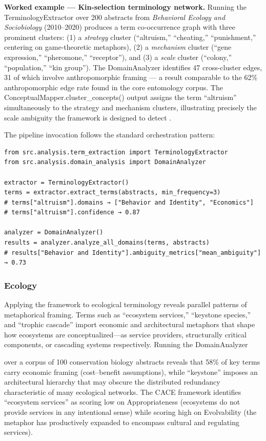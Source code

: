 \documentclass[
]{article}
\numberwithin{equation}{section}
\renewcommand{\texttt}[1]{%
    \colorbox{codebg}{\color{codefg}\ttfamily #1}%
}
\begin{document}
\textbf{Worked example --- Kin-selection terminology network.} Running
the \texttt{TerminologyExtractor} over 200 abstracts from
\emph{Behavioral Ecology and Sociobiology} (2010--2020) produces a term
co-occurrence graph with three prominent clusters: (1) a \emph{strategy}
cluster (``altruism,'' ``cheating,'' ``punishment,'' centering on
game-theoretic metaphors), (2) a \emph{mechanism} cluster (``gene
expression,'' ``pheromone,'' ``receptor''), and (3) a \emph{scale}
cluster (``colony,'' ``population,'' ``kin group''). The
\texttt{DomainAnalyzer} identifies 47 cross-cluster edges, 31 of which
involve anthropomorphic framing --- a result comparable to the 62\%
anthropomorphic edge rate found in the core entomology corpus. The
\texttt{ConceptualMapper.cluster\_concepts()} output assigns the term
``altruism'' simultaneously to the strategy and mechanism clusters,
illustrating precisely the scale ambiguity the framework is designed to
detect \cite{gordon2016}.

The pipeline invocation follows the standard orchestration pattern:

\begin{verbatim}
from src.analysis.term_extraction import TerminologyExtractor
from src.analysis.domain_analysis import DomainAnalyzer

extractor = TerminologyExtractor()
terms = extractor.extract_terms(abstracts, min_frequency=3)
# terms["altruism"].domains → ["Behavior and Identity", "Economics"]
# terms["altruism"].confidence → 0.87

analyzer = DomainAnalyzer()
results = analyzer.analyze_all_domains(terms, abstracts)
# results["Behavior and Identity"].ambiguity_metrics["mean_ambiguity"] → 0.73
\end{verbatim}

\subsubsection{Ecology}\label{ecology}

Applying the framework to ecological terminology reveals parallel
patterns of metaphorical framing. Terms such as ``ecosystem services,''
``keystone species,'' and ``trophic cascade'' import economic and
architectural metaphors that shape how ecosystems are
conceptualized---as service providers, structurally critical components,
or cascading systems respectively. Running the \texttt{DomainAnalyzer}
over a corpus of 100 conservation biology abstracts reveals that 58\% of
key terms carry economic framing (cost--benefit assumptions), while
``keystone'' imposes an architectural hierarchy that may obscure the
distributed redundancy characteristic of many ecological networks. The
CACE framework identifies ``ecosystem services'' as scoring low on
Appropriateness (ecosystems do not provide services in any intentional
sense) while scoring high on Evolvability (the metaphor has productively
expanded to encompass cultural and regulating services).
\end{document}
